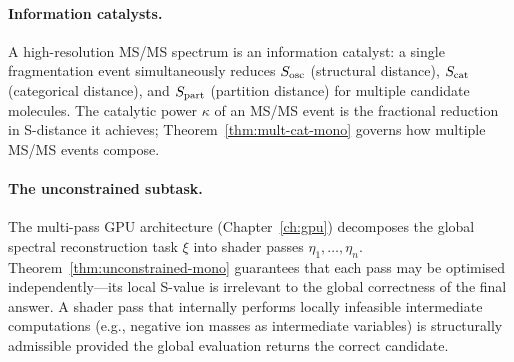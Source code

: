 \paragraph{Information catalysts.}
A high-resolution MS/MS spectrum is an information catalyst: a single
fragmentation event simultaneously reduces $S_{\mathrm{osc}}$ (structural distance), $S_{\mathrm{cat}}$
(categorical distance), and $S_{\mathrm{part}}$ (partition distance) for multiple candidate
molecules.  The catalytic power $\kappa$ of an MS/MS event is the fractional
reduction in S-distance it achieves; Theorem~\ref{thm:mult-cat-mono} governs
how multiple MS/MS events compose.

\paragraph{The unconstrained subtask.}
The multi-pass GPU architecture (Chapter~\ref{ch:gpu}) decomposes the global
spectral reconstruction task $\xi$ into shader passes $\eta_1, \ldots, \eta_n$.
Theorem~\ref{thm:unconstrained-mono} guarantees that each pass may be optimised
independently---its local S-value is irrelevant to the global correctness of
the final answer.  A shader pass that internally performs locally infeasible
intermediate computations (e.g., negative ion masses as intermediate variables)
is structurally admissible provided the global evaluation returns the correct
candidate.

